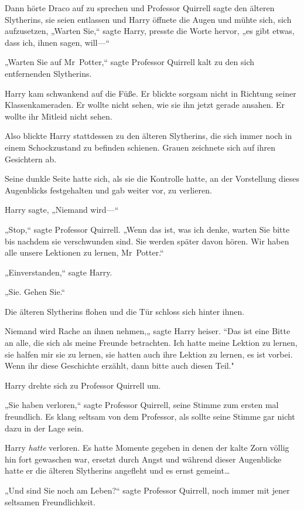 {Dann hörte Draco auf zu sprechen und Professor Quirrell sagte den älteren Slytherins, sie seien entlassen und Harry öffnete die Augen und mühte sich, sich aufzusetzen, „Warten Sie,“ sagte Harry, presste die Worte hervor, „es gibt etwas, dass ich, ihnen sagen, will—“

„Warten Sie auf Mr~Potter,“ sagte Professor Quirrell kalt zu den sich entfernenden Slytherins.

Harry kam schwankend auf die Füße. Er blickte sorgsam nicht in Richtung seiner Klassenkameraden. Er wollte nicht sehen, wie sie ihn jetzt gerade ansahen. Er wollte ihr Mitleid nicht sehen.

Also blickte Harry stattdessen zu den älteren Slytherins, die sich immer noch in einem Schockzustand zu befinden schienen. Grauen zeichnete sich auf ihren Gesichtern ab.

Seine dunkle Seite hatte sich, als sie die Kontrolle hatte, an der Vorstellung dieses Augenblicks festgehalten und gab weiter vor, zu verlieren.

Harry sagte, „Niemand wird—“

„Stop,“ sagte Professor Quirrell. „Wenn das ist, was ich denke, warten Sie bitte bis nachdem sie verschwunden sind. Sie werden später davon hören. Wir haben alle unsere Lektionen zu lernen, Mr~Potter.“

„Einverstanden,“ sagte Harry.

„Sie. Gehen Sie.“

Die älteren Slytherins flohen und die Tür schloss sich hinter ihnen.

Niemand wird Rache an ihnen nehmen,„ sagte Harry heiser. “Das ist eine Bitte an alle, die sich als meine Freunde betrachten. Ich hatte meine Lektion zu lernen, sie halfen mir sie zu lernen, sie hatten auch ihre Lektion zu lernen, es ist vorbei. Wenn ihr diese Geschichte erzählt, dann bitte auch diesen Teil."

Harry drehte sich zu Professor Quirrell um.

„Sie haben verloren,“ sagte Professor Quirrell, seine Stimme zum ersten mal freundlich. Es klang seltsam von dem Professor, als sollte seine Stimme gar nicht dazu in der Lage sein.

Harry \emph{hatte} verloren. Es hatte Momente gegeben in denen der kalte Zorn völlig hin fort gewaschen war, ersetzt durch Angst und während dieser Augenblicke hatte er die älteren Slytherins angefleht und es ernst gemeint…

„Und sind Sie noch am Leben?“ sagte Professor Quirrell, noch immer mit jener seltsamen Freundlichkeit.

}
